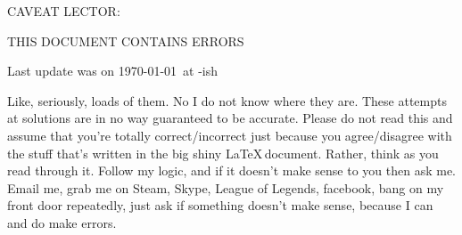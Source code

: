 \documentclass{article}
\begin{document}
\newcommand{\nl}{\mbox{}\\} %
\newcommand{\altx}{\:|\:} %
\newcommand{\alty}{\\[0.1cm]&\:|\:&} %
\newcommand{\minus}{\mbox{-}} %
\newcommand{\term}[1]{\,\mbox{\tt #1}\,} %
\newcommand{\str}{\stackrel{.}{\rightsquigarrow}} %
\newcommand{\sts}{\stackrel{_{*}}{\rightsquigarrow}} %
\newcommand{\nat}{\rightsquigarrow} %
\newcommand{\axm}[4]{\item[{\sc #1 :
}]\begin{tabular}{cc}#2\\\hline#3\\\end{tabular}\quad#4}
\newcommand{\sem}[1]{[\![#1]\!]}
\newcommand{\lam}[2]{\lambda {#1} \,.\, #2}
\newcommand{\lfp}[1]{lfp\,(\,#1\,)}
\newcommand{\fix}[1]{fix\,(\,#1\,)}
\newcommand{\hoarep}[3]{\{#1\}\,#2\,\{#3\}}
\newcommand{\hoareP}[3]{\left\{\begin{array}{c}#1\end{array}\right\}\,#2\,\newline\left\{\begin{array}{c}#3\end{array}\right\}}
\newcommand{\hoaret}[3]{[#1]\,#2\,[#3]}
\newcommand{\hoareT}[3]{\left[\begin{array}{c}#1\end{array}\right]\,#2\,\left[\begin{array}{c}#3\end{array}\right]}
\newcommand{\assume}[1]{$\blacklozenge$ #1}
\newcommand{\st}{\,\; st \,\;}
\newcommand{\pr}{\mathbb{P}}


\begin{center}
	\Huge{CAVEAT LECTOR:}
\end{center}
\begin{center}
	\Large{THIS DOCUMENT CONTAINS ERRORS}
\end{center}
\begin{center}
Last update was on \today \, at \currenttime-ish
\end{center}

Like, seriously, loads of them. No I do not know where they are. These attempts
at solutions are in no way guaranteed to be accurate. Please do not read this
and assume that you're totally correct/incorrect just because you agree/disagree
with the stuff that's written in the big shiny \LaTeX \,document. Rather, think
as you read through it. Follow my logic, and if it doesn't make sense to you
then ask me. Email me\footnotemark[1],
grab me on Steam, Skype, League of Legends\footnotemark[2], facebook, bang on my front door
repeatedly\footnotemark[3], just ask if something doesn't make sense, because I
can and do make errors.
\end{document}

